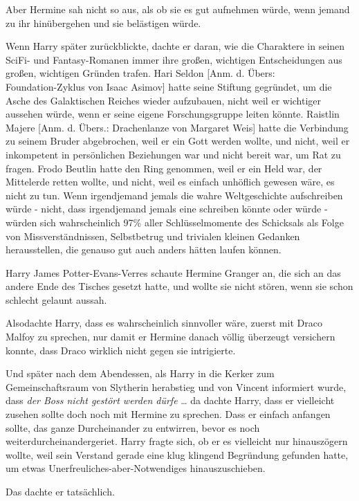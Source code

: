 {Aber Hermine sah nicht so aus, als ob sie es gut aufnehmen würde, wenn jemand zu ihr hinübergehen und sie belästigen würde.

Wenn Harry später zurückblickte, dachte er daran, wie die Charaktere in seinen SciFi- und Fantasy-Romanen immer ihre großen, wichtigen Entscheidungen aus großen, wichtigen Gründen trafen. Hari Seldon {[}Anm. d. Übers:\\ Foundation-Zyklus von Isaac Asimov{]} hatte seine Stiftung gegründet, um die Asche des Galaktischen Reiches wieder aufzubauen, nicht weil er wichtiger aussehen würde, wenn er seine eigene Forschungsgruppe leiten könnte. Raistlin Majere {[}Anm. d. Übers.: Drachenlanze von Margaret Weis{]} hatte die Verbindung zu seinem Bruder abgebrochen, weil er ein Gott werden wollte, und nicht, weil er inkompetent in persönlichen Beziehungen war und nicht bereit war, um Rat zu fragen. Frodo Beutlin hatte den Ring genommen, weil er ein Held war, der Mittelerde retten wollte, und nicht, weil es einfach unhöflich gewesen wäre, es nicht zu tun. Wenn irgendjemand jemals die wahre Weltgeschichte aufschreiben würde - nicht, dass irgendjemand jemals eine schreiben könnte oder würde - würden sich wahrscheinlich 97\% aller Schlüsselmomente des Schicksals als Folge von Missverständnissen, Selbstbetrug und trivialen kleinen Gedanken herausstellen, die genauso gut auch anders hätten laufen können.

Harry James Potter-Evans-Verres schaute Hermine Granger an, die sich an das andere Ende des Tisches gesetzt hatte, und wollte sie nicht stören, wenn sie schon schlecht gelaunt aussah.

Alsodachte Harry, dass es wahrscheinlich sinnvoller wäre, zuerst mit Draco Malfoy zu sprechen, nur damit er Hermine danach völlig überzeugt versichern konnte, dass Draco wirklich nicht gegen sie intrigierte.

Und später nach dem Abendessen, als Harry in die Kerker zum Gemeinschaftsraum von Slytherin herabstieg und von Vincent informiert wurde, dass \emph{der Boss nicht gestört werden dürfe} … da dachte Harry, dass er vielleicht zusehen sollte doch noch mit Hermine zu sprechen. Dass er einfach anfangen sollte, das ganze Durcheinander zu entwirren, bevor es noch weiterdurcheinandergeriet. Harry fragte sich, ob er es vielleicht nur hinauszögern wollte, weil sein Verstand gerade eine klug klingend Begründung gefunden hatte, um etwas Unerfreuliches-aber-Notwendiges hinauszuschieben.

Das dachte er tatsächlich.

}
